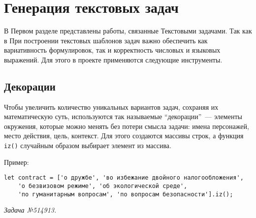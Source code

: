 \section{Генерация текстовых задач}

В Первом разделе представлены работы, связанные Текстовыми задачами. 
Так как в 
При построении текстовых шаблонов задач важно обеспечить как вариативность формулировок, так и корректность числовых и языковых выражений. Для этого в проекте применяются следующие инструменты.

\subsection{Декорации}

Чтобы увеличить количество уникальных вариантов задач, сохраняя их математическую суть, используются так называемые ``декорации''~--- элементы окружения, которые можно менять без потери смысла задачи: имена персонажей, место действия, цель, контекст. 
Для этого создаются массивы строк, а функция \texttt{iz()} случайным образом выбирает элемент из массива.

Пример:
\begin{lstlisting}
let contract = ['о дружбе', 'во избежание двойного налогообложения',
    'о безвизовом режиме', 'об экологической среде',
    'по гуманитарным вопросам', 'по вопросам безопасности'].iz();
\end{lstlisting}
\textsl{Задача №514913.}
 

